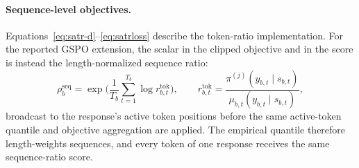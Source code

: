 \paragraph{Sequence-level objectives.}
Equations~\eqref{eq:satr-d}--\eqref{eq:satrloss} describe the token-ratio implementation. For the reported GSPO extension, the scalar in the clipped objective and in the \satr{} score is instead the length-normalized sequence ratio:
\begin{equation}
\rho^{\mathrm{seq}}_{b}=\exp\!\Big(\frac{1}{T_b}\sum_{t=1}^{T_b}\log r^{\mathrm{tok}}_{b,t}\Big),
\qquad
r^{\mathrm{tok}}_{b,t}=\frac{\pi^{(j)}(y_{b,t}\mid s_{b,t})}{\mu_{b,t}(y_{b,t}\mid s_{b,t})},
\label{eq:gspo-ratio}
\end{equation}
broadcast to the response's active token positions before the same active-token quantile and objective aggregation are applied. The empirical quantile therefore length-weights sequences, and every token of one response receives the same sequence-ratio score. 


